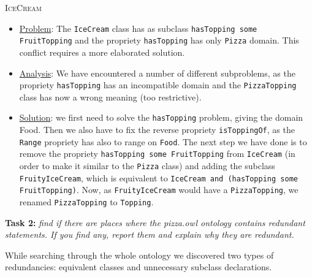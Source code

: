 \documentclass[12pt]{article}
\newcommand{\vrbsome}{{\color{magenta}some }}
\newcommand{\vrband}{{\color{cyan}and }}
\begin{document}
\textsc{IceCream}
\begin{itemize}
\item{\underline{Problem}: The \texttt{IceCream} class has as subclass \texttt{hasTopping \vrbsome FruitTopping} and the propriety \texttt{hasTopping} has only \texttt{Pizza} domain. This conflict requires a more elaborated solution.}

\item{\underline{Analysis}: We have encountered a number of different subproblems, as the propriety \texttt{hasTopping} has an incompatible domain and the \texttt{PizzaTopping} class has now a wrong meaning (too restrictive).}

\item{\underline{Solution}: we first need to solve the \texttt{hasTopping} problem, giving the domain Food. Then we also have to fix the reverse propriety \texttt{isToppingOf}, as the \texttt{Range} propriety has also to range on \texttt{Food}. The next step we have done is to remove the propriety \texttt{hasTopping \vrbsome FruitTopping} from \texttt{IceCream} (in order to make it similar to the \texttt{Pizza} class) and adding the subclass \texttt{FruityIceCream}, which is equivalent to \texttt{IceCream \vrband (hasTopping some FruitTopping)}. Now, as \texttt{FruityIceCream} would have a \texttt{PizzaTopping}, we renamed \texttt{PizzaTopping} to \texttt{Topping}.}
\end{itemize}

\textbf{Task 2:} \textit{find if there are places where the pizza.owl ontology contains redundant statements. If you find any, report them and explain why they are redundant.}

While searching through the whole ontology we discovered two types of redundancies: equivalent classes and unnecessary subclass declarations.
\end{document}
